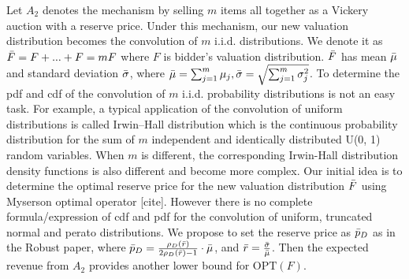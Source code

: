 Let $A_2$ denotes the mechanism by selling $m$ items all together as a Vickery auction with a reserve price. Under this mechanism, our new valuation distribution becomes the convolution of $m$ i.i.d. distributions. We denote it as $\Bar{F} = F+...+F = mF$ where $F$ is bidder's valuation distribution. $\Bar{F}$ has mean $\Bar{\mu}$ and standard deviation $\Bar{\sigma}$, where $\Bar{\mu} = \sum^{m}_{j=1} \mu_j, \Bar{\sigma} = \sqrt{\sum^{m}_{j=1} \sigma^2_j}$. To determine the pdf and cdf of the convolution of $m$ i.i.d. probability distributions is not an easy task. For example, a typical application of the convolution of uniform distributions is called Irwin–Hall distribution which is the continuous probability distribution for the sum of $m$ independent and identically distributed U(0, 1) random variables. When $m$ is different, the corresponding Irwin-Hall distribution \cite{johnson1995continuous} density functions is also different and become more complex. Our initial idea is to determine the optimal reserve price for the new valuation distribution $\Bar{F}$ using Myserson optimal operator [cite]. However there is no complete formula/expression of cdf and pdf for the convolution of uniform, truncated normal and perato distributions. We propose to set the reserve price as $\Bar{p}_D$ as in the Robust paper, where $\Bar{p}_D = \frac{\rho_D(\Bar{r})}{2\rho_D(\Bar{r}) - 1} \cdot \Bar{\mu}$, and $\Bar{r} = \frac{\Bar{\sigma}}{\Bar{\mu}}$. Then the expected revenue from $A_2$ provides another lower bound for $\text{OPT}(F)$.




